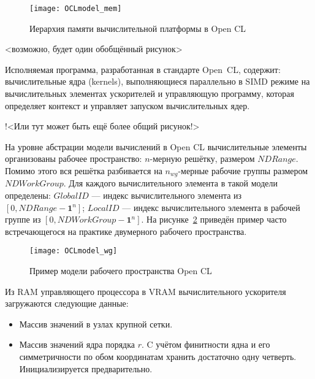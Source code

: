\begin{figure}[h!]
  \centering
  \texttt{[image: OCLmodel\_mem]} 
  \caption{Иерархия памяти вычислительной платформы в Open CL}
  \label{fig:OCL_wg}
\end{figure}
\FloatBarrier

<возможно, будет один обобщённый рисунок>

Исполняемая программа, разработанная в стандарте Open~CL,
содержит:  
вычислительные ядра (kernels), выполняющиеся
параллельно 
в SIMD режиме 
на вычислительных элементах ускорителей
и управляющую программу, которая
определяет контекст и 
управляет запуском вычислительных ядер.

!<Или тут может быть ещё более общий рисунок!>



На уровне абстрации модели вычислений в Open CL
вычислительные элементы организованы рабочее пространство:
$n$-мерную решётку,
размером $NDRange$.
Помимо этого вся решётка разбивается на $n_{wg}$-мерные рабочие группы
размером $NDWorkGroup$. 
Для каждого вычислительного элемента в такой модели определены:  
$GlobalID$ %
--- индекс вычислительного элемента из $[0, NDRange - \mathbf{1}^n]$;
$LocalID$ --- индекс вычислительного элемента в рабочей группе
из $[0, NDWorkGroup - \mathbf{1}^n]$. 
На рисунке~\ref{fig:OCL_wg} приведён пример
часто встречающегося на практике двумерного рабочего пространства.

\begin{figure}[h!]
  \centering
  \texttt{[image: OCLmodel\_wg]} 
  \caption{Пример модели рабочего пространства Open CL}
  \label{fig:OCL_wg}
\end{figure}
\FloatBarrier


Из RAM управляющего процессора
в VRAM вычислительного ускорителя
загружаются следующие данные: 
\begin{itemize}
\item
  Массив значений в узлах крупной сетки. %
\item
  Массив значений ядра порядка $r$. %
  C учётом финитности ядна и его симметричности по
  обом координатам хранить достаточно одну четверть.
  Инициализируется предварительно.
\end{itemize}

